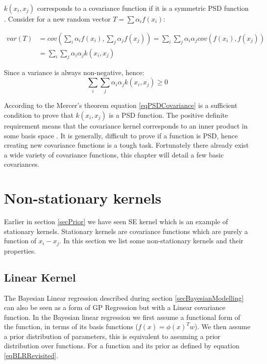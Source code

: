 $k(x_{i}, x_{j})$ corresponds to a covariance function if it is a symmetric PSD function \cite{loeve1978probability, durrande2001etude}. Consider for a new random vector $T = \sum \alpha_{i}f(x_{i})$:

\begin{equation}\label{eqDerivePSDCovariance}
    \begin{aligned}
        var(T) & = cov\left ( \sum_{i} \alpha_{i}f(x_{i}), \sum_{j} \alpha_{j}f(x_{j}) \right ) = \sum_{i}\sum_{j}\alpha_{i}\alpha_{j}cov(f(x_{i}), f(x_{j})) \\
& = \sum_{i}\sum_{j}\alpha_{i}\alpha_{j}k(x_{i}, x_{j})
    \end{aligned}
\end{equation}

Since a variance is always non-negative, hence:
\begin{equation}\label{eqPSDCovariance}
\sum_{i}\sum_{j}\alpha_{i}\alpha_{j}k(x_{i}, x_{j}) \geq 0
\end{equation}

According to the Mercer's theorem  \cite{mercer1909functions} equation \ref{eqPSDCovariance} is a sufficient condition to prove that $k(x_{i}, x_{j})$ is a PSD function. The positive definite requirement means that the covariance kernel corresponds to an inner product in some basis space \cite{bishop2006pattern}. It is generally, difficult to prove if a function is PSD, hence creating new covariance functions is a tough task. Fortunately there already exist a wide variety of covariance functions, this chapter will detail a few basic covariances. 

\section{Non-stationary kernels}\label{secNonStationaryKernels}
Earlier in section \ref{secPrior} we have seen SE kernel which is an example of stationary kernels. Stationary kernels are covariance functions which are purely a function of $x_{i} - x_{j}$. In this section we list some non-stationary kernels and their properties. 

\subsection{Linear Kernel} \label{subSecCh4LinearKernel}
The Bayesian Linear regression described during section \ref{secBayesianModelling} can also be seen as a form of GP Regression but with a Linear covariance function. In the Bayesian linear regression we first assume a functional form of the function, in terms of its basis functions ($f(x) = \phi(x)^{T}w$). We then assume a prior distribution of parameters, this is equivalent to assuming a prior distribution over functions. For a function and its prior as defined by equation \ref{eqBLRRevisited}.

